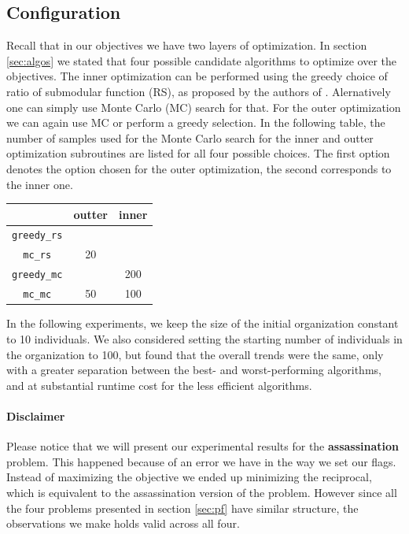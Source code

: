 \subsection{Configuration}

Recall that in our objectives we have two layers of optimization. In section \ref{sec:algos} we stated that four possible candidate algorithms to optimize over the objectives. The inner optimization can be performed using the greedy choice of ratio of submodular function (RS), as proposed by the authors of \cite{bai2016algorithms}. Alernatively one can simply use Monte Carlo (MC) search for that. For the outer optimization we can again use MC or perform a greedy selection. In the following table, the number of samples used for the Monte Carlo search for the inner and outter optimization subroutines are listed for all four possible choices. The first option denotes the option chosen for the outer optimization, the second corresponds to the inner one.

\begin{center}
	\begin{tabular}{ c|c|c } 
		 & outter & inner \\
		\hline
		\texttt{greedy\_rs} &  &  \\
		\texttt{mc\_rs} & 20 &  \\
 		\texttt{greedy\_mc} &  & 200 \\
 		\texttt{mc\_mc} & 50 & 100 \\
	\end{tabular}
\end{center}

In the following experiments, we keep the size of the initial organization constant to 10 individuals. 
We also considered setting the starting number of individuals in the organization to 100, but found that the overall trends were the same, only with a greater separation between the best- and worst-performing algorithms, and at substantial runtime cost for the less efficient algorithms.

\paragraph*{Disclaimer}

Please notice that we will present our experimental results for the \textbf{assassination} problem. This happened because of an error we have in the way we set our flags. Instead of maximizing the objective we ended up minimizing the reciprocal, which is equivalent to the assassination version of the problem. However since all the four problems presented in section \ref{sec:pf} have similar structure, the observations we make holds valid across all four.

